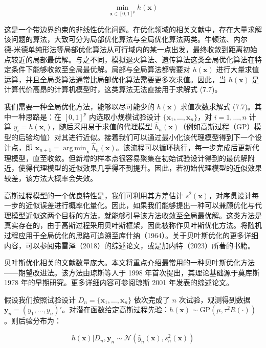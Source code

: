 \documentclass{ctexart}
\DeclareMathOperator*{\argmin}{arg\,min}
\begin{document}
\begin{equation*}
\min_{\boldsymbol{x}\in[0,1]^p}h(\boldsymbol{x})
\tag{7.7}
\end{equation*}

这是一个带边界约束的非线性优化问题。在优化领域的相关文献中，存在大量求解该问题的算法，大致可分为局部优化算法与全局优化算法两类。牛顿法、内尔德‑米德单纯形法等局部优化算法从可行域内的某一点出发，最终收敛到距离初始点较近的局部最优解。与之不同，模拟退火算法、遗传算法这类全局优化算法在特定条件下能够收敛至全局最优解。局部与全局算法都需要对 $h(\boldsymbol{x})$ 进行大量求值运算，并且全局类算法通常比局部优化算法需要更多次求值。因此，当 $h(\boldsymbol{x})$ 是计算代价高昂的计算机模型时，这类算法无法直接用于求解式 (7.7)。

我们需要一种全局优化方法，能够以尽可能少的 $h(\boldsymbol{x})$ 求值次数求解式 (7.7)。其中一种思路是：在 $[0,1]^p$ 内选取小规模试验设计 $\{\boldsymbol{x}_1,\dots,\boldsymbol{x}_n\}$，对 $i=1,\dots,n$ 计算 $y_i=h(\boldsymbol{x}_i)$，随后采用易于求值的代理模型 $\widehat h_n(\boldsymbol{x})$（例如高斯过程（GP）模型的后验均值）对其进行近似。接着我们可以通过最小化该代理模型得到下一个设计点，即 $\boldsymbol{x}_{n+1}=\argmin_{\boldsymbol{x}}\widehat h_n(\boldsymbol{x})$。该流程可以循环执行，每一步完成后更新代理模型，直至收敛。但新增的样本点很容易聚集在初始试验设计得到的最优解附近，使得代理模型的近似效果几乎得不到提升。因此，若初始代理模型的近似效果较差，该方法大概率会失效。

高斯过程模型的一个优良特性是，我们可利用其方差估计 $s^2(\boldsymbol{x})$，对序贯设计每一步的近似误差进行概率化量化。因此，如果我们能够提出一种可以兼顾优化与代理模型近似这两个目标的方法，就能够引导该方法收敛至全局最优解。这类方法是真实存在的，由于高斯过程采用贝叶斯框架，因此被称作贝叶斯优化方法。将随机过程应用于全局优化的思路可追溯至库什纳（1964）。关于贝叶斯优化的更多详细内容，可以参阅弗雷泽（2018）的综述论文，或是加内特（2023）所著的书籍。

贝叶斯优化相关的文献数量庞大。本文将重点介绍最常用的一种贝叶斯优化方法——期望改进法。该方法由琼斯等人于 1998 年首次提出，其理论基础源于莫库斯 1978 年的早期研究。更多详细内容可参阅琼斯 2001 年发表的综述论文。

假设我们按照试验设计 $D_n=\{\boldsymbol{x}_1,\dots,\boldsymbol{x}_n\}$ 依次完成了 $n$ 次试验，观测得到数据 $\boldsymbol{y}_n=(y_1,\dots,y_n)'$。对潜在函数给定高斯过程先验：$h(\boldsymbol{x})\sim\mathrm{GP}(\mu,\tau^2R(\cdot))$。则后验分布为：

\begin{equation*}
h(\boldsymbol{x})|D_n,\boldsymbol{y}_n\sim\mathcal{N}(\widehat{y}_n(\boldsymbol{x}),s_n^2(\boldsymbol{x}))
\tag{7.8}
\end{equation*}
\end{document}
